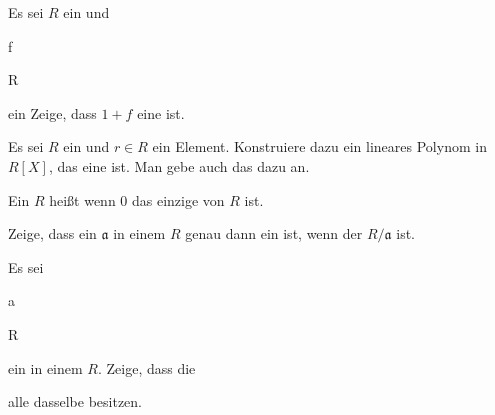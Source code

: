 {} {}




{}


{


Es sei $R$ ein
 und


\mavergleichskette


{\vergleichskette


{ f
}


{ \in }{ R
}


{  }{
}


{    }{
}


{   }{
}


}
{}{}{}
ein
Zeige, dass $1+f$ eine
ist.


}


{} {}




{}


{


Es sei $R$ ein
 und $r\in R$ ein
Element. Konstruiere dazu ein lineares Polynom in $R[X]$, das eine
ist. Man gebe auch das
dazu an.


}


{} {}


Ein
$R$ heißt  wenn $0$ das einzige
von $R$ ist.




{}


{


Zeige, dass ein
${\mathfrak a}$ in einem
$R$ genau dann ein
ist, wenn der
$R/ {\mathfrak a}$
ist.


}


{} {}




{}


{


Es sei


\mavergleichskette


{\vergleichskette


{ {\mathfrak a}
}


{ \subseteq }{ R
}


{  }{
}


{    }{
}


{   }{
}


}
{}{}{}
ein
in einem
$R$. Zeige, dass die


 alle dasselbe
besitzen.


}



